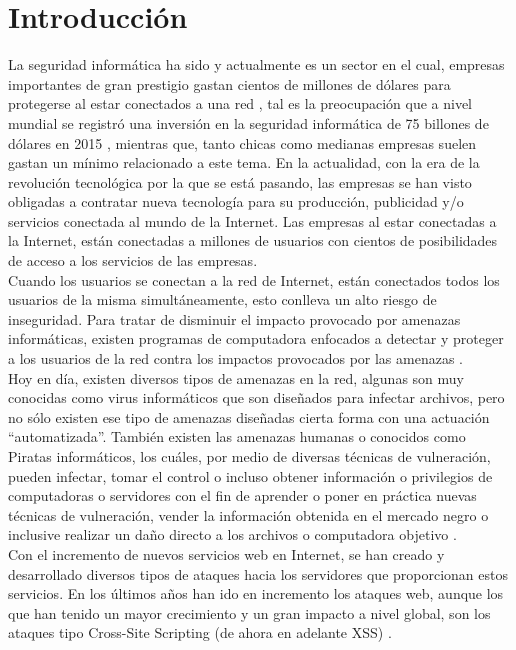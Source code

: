 \section{Introducción}

La seguridad informática ha sido y actualmente es un sector en el cual, empresas importantes de gran prestigio gastan cientos de
millones de dólares para protegerse al estar conectados a una red \cite{uno}, tal es la preocupación que a nivel mundial se registró una
inversión en la seguridad informática de 75 billones de dólares en 2015 \cite{dos}, mientras que, tanto chicas como medianas empresas
suelen gastan un mínimo relacionado a este tema. En la actualidad, con la era de la revolución tecnológica por la que se está
pasando, las empresas se han visto obligadas a contratar nueva tecnología para su producción, publicidad y/o servicios conectada al
mundo de la Internet. Las empresas al estar conectadas a la Internet, están conectadas a millones de usuarios con cientos de
posibilidades de acceso a los servicios de las empresas.\\

Cuando los usuarios se conectan a la red de Internet, están conectados todos los usuarios de la misma simultáneamente, esto
conlleva un alto riesgo de inseguridad. Para tratar de disminuir el impacto provocado por amenazas informáticas, existen
programas de computadora enfocados a detectar y proteger a los usuarios de la red contra los impactos provocados por las
amenazas \cite{tres}.\\

Hoy en día, existen diversos tipos de amenazas en la red, algunas son muy conocidas como virus informáticos que son diseñados
para infectar archivos, pero no sólo existen ese tipo de amenazas diseñadas cierta forma con una actuación “automatizada”.
También existen las amenazas humanas o conocidos como Piratas informáticos, los cuáles, por medio de diversas técnicas de
vulneración, pueden infectar, tomar el control o incluso obtener información o privilegios de computadoras o servidores con el fin
de aprender o poner en práctica nuevas técnicas de vulneración, vender la información obtenida en el mercado negro o inclusive
realizar un daño directo a los archivos o computadora objetivo \cite{cuatro}\cite{cinco}.\\

Con el incremento de nuevos servicios web en Internet, se han creado y desarrollado diversos tipos de ataques hacia los servidores
que proporcionan estos servicios. En los últimos años han ido en incremento los ataques web, aunque los que han tenido un mayor
crecimiento y un gran impacto a nivel global, son los ataques tipo Cross-Site Scripting (de ahora en adelante XSS) \cite{seis}.

